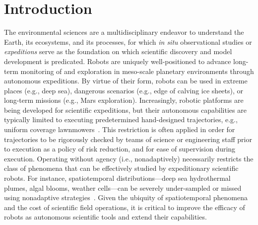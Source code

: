 \chapter{Introduction}


\noindent The environmental sciences are a multidisciplinary endeavor to understand the Earth, its ecosystems, and its processes, for which \emph{in situ} observational studies or \emph{expeditions} serve as the foundation on which scientific discovery and model development is predicated.
Robots are uniquely well-positioned to advance long-term monitoring of and exploration in meso-scale planetary environments through autonomous expeditions.
By virtue of their form, robots can be used in extreme places (e.g., deep sea), dangerous scenarios (e.g., edge of calving ice sheets), or long-term missions (e.g., Mars exploration).
Increasingly, robotic platforms are being developed for scientific expeditions, but their autonomous capabilities are typically limited to executing predetermined hand-designed trajectories, e.g., uniform coverage lawnmowers~\autocite{camilli2010tracking}.
This restriction is often applied in order for trajectories to be rigorously checked by teams of science or engineering staff prior to execution as a policy of risk reduction, and for ease of supervision during execution.
Operating without agency (i.e., nonadaptively) necessarily restricts the class of phenomena that can be effectively studied by expeditionary scientific robots.
For instance, spatiotemporal distributions---deep sea hydrothermal plumes, algal blooms, weather cells---can be severely under-sampled or missed using nonadaptive strategies~\autocite{flaspohler2019information}.
Given the ubiquity of spatiotemporal phenomena and the cost of scientific field operations, it is critical to improve the efficacy of robots as autonomous scientific tools and extend their capabilities.

